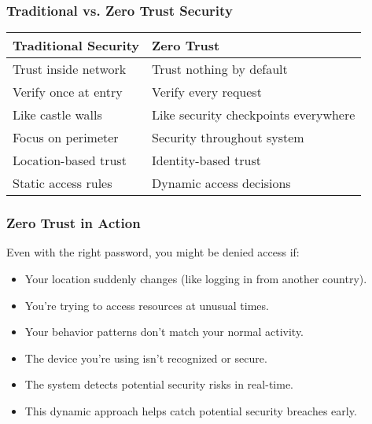 \documentclass{beamer}
\begin{document}
\begin{frame}
    \frametitle{Traditional vs. Zero Trust Security}
    \begin{table}
        \begin{tabular}{|p{}|p{}|}
            \hline
            \textbf{Traditional Security} & \textbf{Zero Trust} \\
            \hline
            Trust inside network & Trust nothing by default \\
            \hline
            Verify once at entry & Verify every request \\
            \hline
            Like castle walls & Like security checkpoints everywhere \\
            \hline
            Focus on perimeter & Security throughout system \\
            \hline
            Location-based trust & Identity-based trust \\
            \hline
            Static access rules & Dynamic access decisions \\
            \hline
        \end{tabular}
    \end{table}
\end{frame}


\begin{frame}
    \frametitle{Zero Trust in Action}
    Even with the right password, you might be denied access if:
    \begin{itemize}
        \item Your location suddenly changes (like logging in from another country).
        \item You're trying to access resources at unusual times.
        \item Your behavior patterns don't match your normal activity.
        \item The device you're using isn't recognized or secure.
        \item The system detects potential security risks in real-time.
        \item This dynamic approach helps catch potential security breaches early.
    \end{itemize}
\end{frame}
\end{document}
